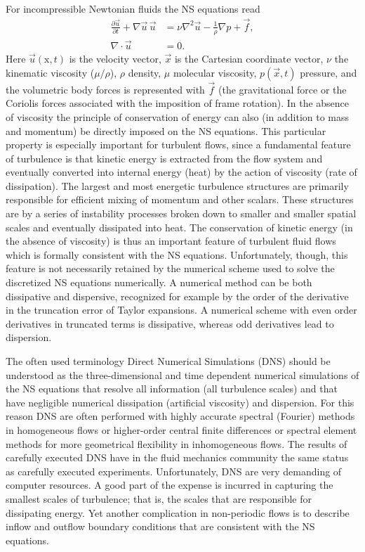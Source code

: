 For incompressible Newtonian fluids the NS equations read
\begin{align}
 \frac{\partial \vec{u}}{\partial t}+\nabla \vec{u} \,  \vec{u}
      &= \nu \nabla^2 \vec{u} -\frac{1}{\rho} \nabla p +\vec{f}, \label{eq:mortensen:NS}
\\
 \nabla \cdot \vec{u} &=0.
 \label{eq:mortensen:cont}
\end{align}
Here $\vec{u}(\text{x},t)$ is the velocity vector, $\vec{x}$
is the Cartesian coordinate vector, $\nu$ the kinematic viscosity
($\mu/\rho$), $\rho$ density, $\mu$ molecular viscosity, $p(\vec{x},t)$
pressure, and the volumetric body forces is represented with $\vec{f}$
(the gravitational force or the Coriolis forces associated with the
imposition of frame rotation). In the absence of viscosity the principle
of conservation of energy can also (in addition to mass and momentum)
be directly imposed on the NS equations. This particular property is
especially important for turbulent flows, since a fundamental feature
of turbulence is that kinetic energy is extracted from the flow system
and eventually converted into internal energy (heat) by the action of
viscosity (rate of dissipation). The largest and most energetic turbulence
structures are primarily responsible for efficient mixing of momentum
and other scalars. These structures are by a series of instability
processes broken down to smaller and smaller spatial scales and eventually
dissipated into heat. The conservation of kinetic energy (in the absence
of viscosity) is thus an important feature of turbulent fluid flows which
is formally consistent with the NS equations. Unfortunately, though,
this feature is not necessarily retained by the numerical scheme used to
solve the discretized NS equations numerically. A numerical method can be
both dissipative and dispersive, recognized for example by the order of
the derivative in the truncation error of Taylor expansions. A numerical
scheme with even order derivatives in truncated terms is dissipative,
whereas odd derivatives lead to dispersion.

The often used terminology Direct Numerical Simulations (DNS) should
be understood as the three-dimensional and time dependent numerical
simulations of the NS equations that resolve all information
(all turbulence scales) and that have negligible numerical
dissipation (artificial viscosity) and dispersion. For this reason
DNS are often performed with highly accurate spectral (Fourier)
methods \citep{CanutoHussainiQuarteroniEtAl2007} in homogeneous
flows or higher-order central finite differences or spectral element
methods \citep{Blackburn2009} for more geometrical flexibility in
inhomogeneous flows. The results of carefully executed DNS have in
the fluid mechanics community the same status as carefully executed
experiments. Unfortunately, DNS are very demanding of computer
resources. A good part of the expense is incurred in capturing the
smallest scales of turbulence; that is, the scales that are responsible
for dissipating energy. Yet another complication in non-periodic flows
is to describe inflow and outflow boundary conditions that are consistent
with the NS equations.

